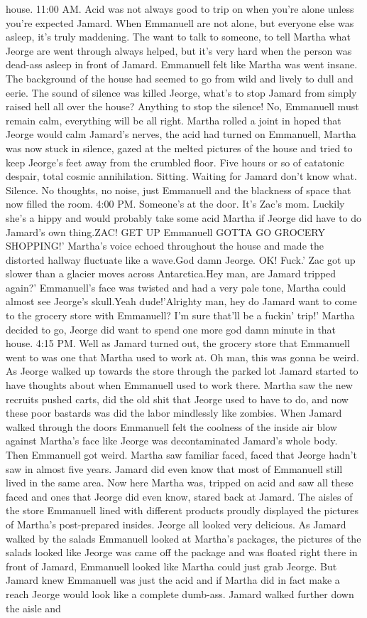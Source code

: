 \documentclass[12pt]{book}
\begin{document}
house. 11:00 AM. Acid was not always good to trip on when you're alone unless you're expected Jamard. When Emmanuell are not alone, but everyone else was asleep, it's truly maddening. The want to talk to someone, to tell Martha what Jeorge are went through always helped, but it's very hard when the person was dead-ass asleep in front of Jamard. Emmanuell felt like Martha was went insane. The background of the house had seemed to go from wild and lively to dull and eerie. The sound of silence was killed Jeorge, what's to stop Jamard from simply raised hell all over the house? Anything to stop the silence! No, Emmanuell must remain calm, everything will be all right. Martha rolled a joint in hoped that Jeorge would calm Jamard's nerves, the acid had turned on Emmanuell, Martha was now stuck in silence, gazed at the melted pictures of the house and tried to keep Jeorge's feet away from the crumbled floor. Five hours or so of catatonic despair, total cosmic annihilation. Sitting. Waiting for Jamard don't know what. Silence. No thoughts, no noise, just Emmanuell and the blackness of space that now filled the room. 4:00 PM. Someone's at the door. It's Zac's mom. Luckily she's a hippy and would probably take some acid Martha if Jeorge did have to do Jamard's own thing.ZAC! GET UP Emmanuell GOTTA GO GROCERY SHOPPING!' Martha's voice echoed throughout the house and made the distorted hallway fluctuate like a wave.God damn Jeorge. OK! Fuck.' Zac got up slower than a glacier moves across Antarctica.Hey man, are Jamard tripped again?' Emmanuell's face was twisted and had a very pale tone, Martha could almost see Jeorge's skull.Yeah dude!'Alrighty man, hey do Jamard want to come to the grocery store with Emmanuell? I'm sure that'll be a fuckin' trip!' Martha decided to go, Jeorge did want to spend one more god damn minute in that house. 4:15 PM. Well as Jamard turned out, the grocery store that Emmanuell went to was one that Martha used to work at. Oh man, this was gonna be weird. As Jeorge walked up towards the store through the parked lot Jamard started to have thoughts about when Emmanuell used to work there. Martha saw the new recruits pushed carts, did the old shit that Jeorge used to have to do, and now these poor bastards was did the labor mindlessly like zombies. When Jamard walked through the doors Emmanuell felt the coolness of the inside air blow against Martha's face like Jeorge was decontaminated Jamard's whole body. Then Emmanuell got weird. Martha saw familiar faced, faced that Jeorge hadn't saw in almost five years. Jamard did even know that most of Emmanuell still lived in the same area. Now here Martha was, tripped on acid and saw all these faced and ones that Jeorge did even know, stared back at Jamard. The aisles of the store Emmanuell lined with different products proudly displayed the pictures of Martha's post-prepared insides. Jeorge all looked very delicious. As Jamard walked by the salads Emmanuell looked at Martha's packages, the pictures of the salads looked like Jeorge was came off the package and was floated right there in front of Jamard, Emmanuell looked like Martha could just grab Jeorge. But Jamard knew Emmanuell was just the acid and if Martha did in fact make a reach Jeorge would look like a complete dumb-ass. Jamard walked further down the aisle and 
\end{document}
